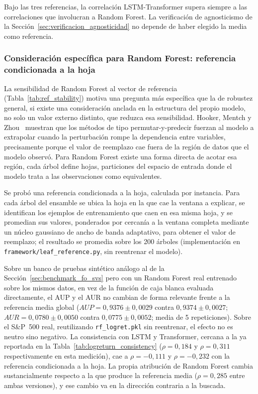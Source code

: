 \documentclass[conference, letterpaper]{IEEEtran}
\begin{document}
Bajo las tres referencias, la correlación LSTM-Transformer supera
siempre a las correlaciones que involucran a Random Forest. La
verificación de agnosticismo de la Sección~\ref{sec:verificacion_agnosticidad}
no depende de haber elegido la media como referencia.

\subsubsection{Consideración específica para Random Forest: referencia condicionada a la hoja}
\label{sec:leaf_reference}

La sensibilidad de Random Forest al vector de referencia
(Tabla~\ref{tab:ref_stability}) motiva una pregunta más específica que
la de robustez general, si existe una consideración anclada en la
estructura del propio modelo, no solo un valor externo distinto, que
reduzca esa sensibilidad. Hooker, Mentch y Zhou~\cite{hooker2021}
muestran que los métodos de tipo permutar-y-predecir fuerzan al
modelo a extrapolar cuando la perturbación rompe la dependencia entre
variables, precisamente porque el valor de reemplazo cae fuera de la
región de datos que el modelo observó. Para Random Forest existe una
forma directa de acotar esa región, cada árbol define hojas,
particiones del espacio de entrada donde el modelo trata a las
observaciones como equivalentes.

Se probó una referencia condicionada a la hoja, calculada por
instancia. Para cada árbol del ensamble se ubica la hoja en la que
cae la ventana a explicar, se identifican los ejemplos de
entrenamiento que caen en esa misma hoja, y se promedian sus valores,
ponderados por cercanía a la ventana completa mediante un núcleo
gaussiano de ancho de banda adaptativo, para obtener el valor de
reemplazo; el resultado se promedia sobre los 200 árboles
(implementación en \texttt{framework/leaf\_reference.py}, sin
reentrenar el modelo).

Sobre un banco de pruebas sintético análogo al de la
Sección~\ref{sec:benchmark_fo_svs} pero con un Random Forest real
entrenado sobre los mismos datos, en vez de la función de caja blanca
evaluada directamente, el AUP y el AUR no cambian de forma relevante
frente a la referencia media global
($AUP=0{,}9376\pm0{,}0029$ contra $0{,}9374\pm0{,}0027$;
$AUR=0{,}0780\pm0{,}0050$ contra $0{,}0775\pm0{,}0052$; media de 5
repeticiones). Sobre el S\&P~500 real, reutilizando
\texttt{rf\_logret.pkl} sin reentrenar, el efecto no es neutro sino
negativo. La consistencia con LSTM y Transformer, cercana a la ya
reportada en la Tabla~\ref{tab:logreturn_consistency}
($\rho=0{,}184$ y $\rho=0{,}311$ respectivamente en esta medición),
cae a $\rho=-0{,}111$ y $\rho=-0{,}232$ con la referencia condicionada
a la hoja. La propia atribución de Random Forest cambia
sustancialmente respecto a la que produce la referencia media
($\rho=0{,}285$ entre ambas versiones), y ese cambio va en la
dirección contraria a la buscada.
\end{document}
